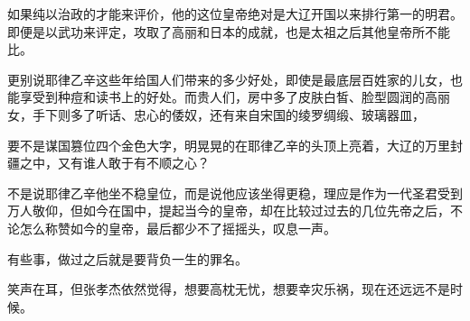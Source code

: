 如果纯以治政的才能来评价，他的这位皇帝绝对是大辽开国以来排行第一的明君。即便是以武功来评定，攻取了高丽和日本的成就，也是太祖之后其他皇帝所不能比。

更别说耶律乙辛这些年给国人们带来的多少好处，即使是最底层百姓家的儿女，也能享受到种痘和读书上的好处。而贵人们，房中多了皮肤白皙、脸型圆润的高丽女，手下则多了听话、忠心的倭奴，还有来自宋国的绫罗绸缎、玻璃器皿，

要不是谋国篡位四个金色大字，明晃晃的在耶律乙辛的头顶上亮着，大辽的万里封疆之中，又有谁人敢于有不顺之心？

不是说耶律乙辛他坐不稳皇位，而是说他应该坐得更稳，理应是作为一代圣君受到万人敬仰，但如今在国中，提起当今的皇帝，却在比较过过去的几位先帝之后，不论怎么称赞如今的皇帝，最后都少不了摇摇头，叹息一声。

有些事，做过之后就是要背负一生的罪名。

笑声在耳，但张孝杰依然觉得，想要高枕无忧，想要幸灾乐祸，现在还远远不是时候。
